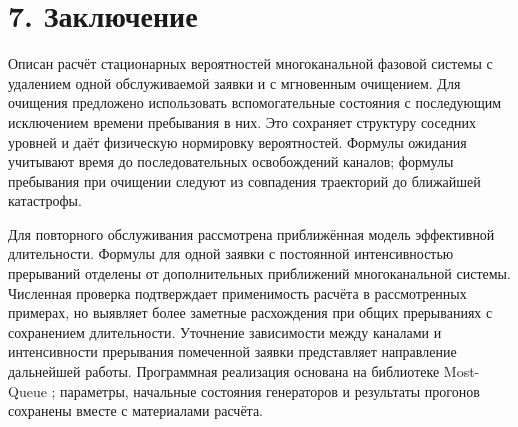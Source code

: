 \FloatBarrier
\section*{7. Заключение}
Описан расчёт стационарных вероятностей многоканальной фазовой системы с удалением одной обслуживаемой заявки и с мгновенным очищением. Для очищения предложено использовать вспомогательные состояния с последующим исключением времени пребывания в них. Это сохраняет структуру соседних уровней и даёт физическую нормировку вероятностей. Формулы ожидания учитывают время до последовательных освобождений каналов; формулы пребывания при очищении следуют из совпадения траекторий до ближайшей катастрофы.

Для повторного обслуживания рассмотрена приближённая модель эффективной длительности. Формулы для одной заявки с постоянной интенсивностью прерываний отделены от дополнительных приближений многоканальной системы. Численная проверка подтверждает применимость расчёта в рассмотренных примерах, но выявляет более заметные расхождения при общих прерываниях с сохранением длительности. Уточнение зависимости между каналами и интенсивности прерывания помеченной заявки представляет направление дальнейшей работы. Программная реализация основана на библиотеке Most-Queue \cite{mostqueue2026}; параметры, начальные состояния генераторов и результаты прогонов сохранены вместе с материалами расчёта.


